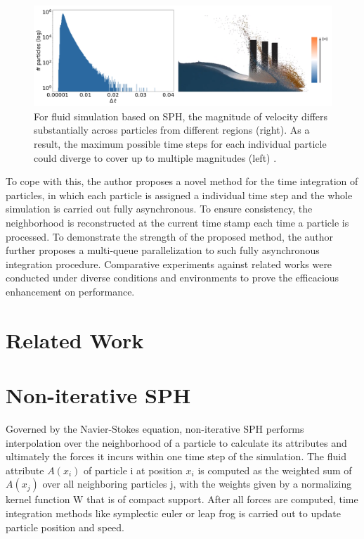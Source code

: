 \documentclass[
	11pt, 
	DIV10,
	ngerman,
	a4paper, 
	oneside, 
	headings=normal, 
	captions=tableheading,
	final, 
	numbers=noenddot
]{scrartcl}
\begin{document}
\begin{figure}[tb]
	\centering
	\includegraphics[scale=0.3]{images/1}
	\caption{
		\label{fig:1} For fluid simulation based on SPH, the magnitude of velocity differs substantially 			across particles from different regions (right). As a result, the maximum possible time steps for each 		individual particle could diverge to cover up to multiple magnitudes (left) \cite{reinhardt2017fully}.
	}
\end{figure}

\par
To cope with this, the author proposes a novel method for the time integration of particles, in which each particle is assigned a individual time step and the whole simulation is carried out fully asynchronous. To ensure consistency, the neighborhood is reconstructed at the current time stamp each time a particle is processed. To demonstrate the strength of the proposed method, the author further proposes a multi-queue parallelization to such fully asynchronous integration procedure. Comparative experiments against related works were conducted under diverse conditions and environments to prove the efficacious enhancement on performance.

\section{Related Work}

\section{Non-iterative SPH}

Governed by the Navier-Stokes equation, non-iterative SPH performs interpolation over the neighborhood of a particle to calculate its attributes and ultimately the forces it incurs within one time step of the simulation. The fluid attribute $ A(x_{i}) $ of particle i at position $ x_{i} $ is computed as the weighted sum of  $ A(x_{j}) $ over all neighboring particles j, with the weights given by a normalizing kernel function W that is of compact support. After all forces are computed, time integration methods like symplectic euler or leap frog is carried out to update particle position and speed.
\end{document}

